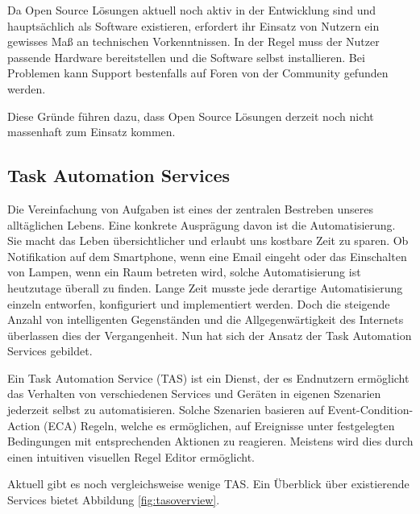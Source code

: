 Da Open Source Lösungen aktuell noch aktiv in der Entwicklung sind und hauptsächlich als Software existieren, erfordert ihr Einsatz von Nutzern ein gewisses Maß an technischen Vorkenntnissen. In der Regel muss der Nutzer passende Hardware bereitstellen und die Software selbst installieren. Bei Problemen kann Support bestenfalls auf Foren von der Community gefunden werden. 

Diese Gründe führen dazu, dass Open Source Lösungen derzeit noch nicht massenhaft zum Einsatz kommen.



\subsection{Task Automation Services}
\label{subsec:tas}
Die Vereinfachung von Aufgaben ist eines der zentralen Bestreben unseres alltäglichen Lebens. Eine konkrete Ausprägung davon ist die Automatisierung. Sie macht das Leben übersichtlicher und erlaubt uns kostbare Zeit zu sparen. Ob Notifikation auf dem Smartphone, wenn eine Email eingeht oder das Einschalten von Lampen, wenn ein Raum betreten wird, solche Automatisierung ist heutzutage überall zu finden. Lange Zeit musste jede derartige Automatisierung einzeln entworfen, konfiguriert und implementiert werden. Doch die steigende Anzahl von intelligenten Gegenständen und die Allgegenwärtigkeit des Internets überlassen dies der Vergangenheit. Nun hat sich der Ansatz der Task Automation Services\cite{ieee:tas} gebildet.

Ein Task Automation Service (TAS) ist ein Dienst, der es Endnutzern ermöglicht das Verhalten von verschiedenen Services und Geräten in eigenen Szenarien jederzeit selbst zu automatisieren. Solche Szenarien basieren auf Event-Condition-Action (ECA) Regeln\cite{ECA}, welche es ermöglichen, auf Ereignisse unter festgelegten Bedingungen mit entsprechenden Aktionen zu reagieren. Meistens wird dies durch  einen intuitiven visuellen Regel Editor ermöglicht.


Aktuell gibt es noch vergleichsweise wenige TAS. Ein Überblick über existierende  Services bietet Abbildung \ref{fig:tasoverview}.

